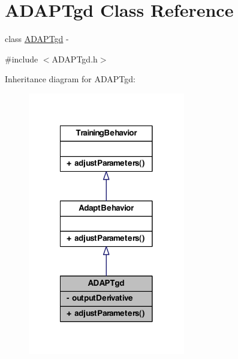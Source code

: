 \hypertarget{class_a_d_a_p_tgd}{
\section{ADAPTgd Class Reference}
\label{class_a_d_a_p_tgd}
}


class \hyperlink{class_a_d_a_p_tgd}{ADAPTgd} -\/  




{\ttfamily \#include $<$ADAPTgd.h$>$}



Inheritance diagram for ADAPTgd:
\nopagebreak
\begin{figure}[H]
\begin{center}
\leavevmode
\includegraphics[width=194pt]{class_a_d_a_p_tgd__inherit__graph}
\end{center}
\end{figure}


